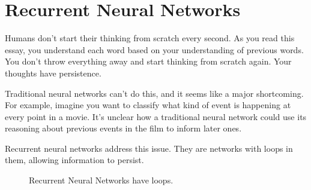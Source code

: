 \documentclass[12pt]{article} %
\begin{document}
\tableofcontents %

\newpage %


\section{Recurrent Neural Networks} %


Humans don't start their thinking from scratch every second. As you read this essay, you understand each word based on your understanding of previous words. You don't throw everything away and start thinking from scratch again. Your thoughts have persistence.

Traditional neural networks can't do this, and it seems like a major shortcoming. For example, imagine you want to classify what kind of event is happening at every point in a movie. It's unclear how a traditional neural network could use its reasoning about previous events in the film to inform later ones.

Recurrent neural networks address this issue. They are networks with loops in them, allowing information to persist.
\begin{figure}[H] %
\caption{Recurrent Neural Networks have loops.}
\label{fig:recurrentneuralnetworkshaveloops}
\end{figure}
\end{document}
